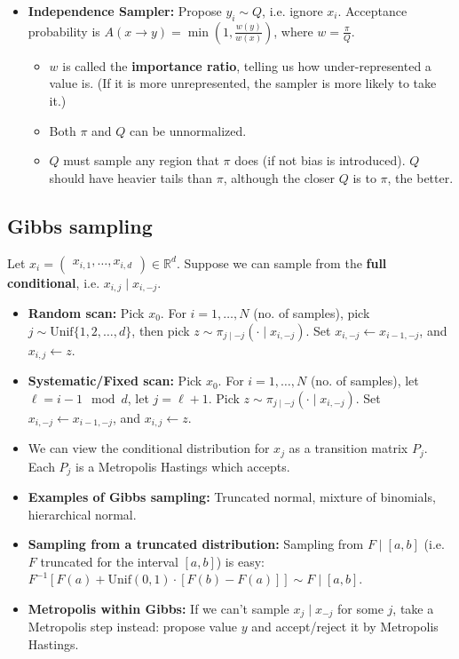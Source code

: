\documentclass[twoside]{article}
\newcommand{\dis}{\displaystyle}
\newcommand\bbR{\mathbb{R}}
\newcommand\goesto{\rightarrow}
\begin{document}
\begin{itemize}
\item \textbf{Independence Sampler:} Propose $y_i \sim Q$, i.e. ignore $x_i$. Acceptance probability is $A(x \goesto y) = \min \left(1, \dis\frac{w(y)}{w(x)} \right)$, where $w = \dis\frac{\pi}{Q}$.
\begin{itemize}
\item $w$ is called the \textbf{importance ratio}, telling us how under-represented a value is. (If it is more unrepresented, the sampler is more likely to take it.)

\item Both $\pi$ and $Q$ can be unnormalized.

\item $Q$ must sample any region that $\pi$ does (if not bias is introduced). $Q$ should have heavier tails than $\pi$, although the closer $Q$ is to $\pi$, the better.

\end{itemize}

\end{itemize}

\subsection*{Gibbs sampling}
Let $x_i = \begin{pmatrix} x_{i,1}, \dots, x_{i, d} \end{pmatrix} \in \bbR^d$. Suppose we can sample from the \textbf{full conditional}, i.e. $x_{i,j} \mid x_{i, -j}$.

\begin{itemize}
\item \textbf{Random scan:} Pick $x_0$. For $i = 1, \dots, N$ (no. of samples), pick $j \sim \text{Unif}\{ 1, 2, \dots, d\}$, then pick $z \sim \pi_{j \mid -j} (\cdot \mid x_{i, -j})$. Set $x_{i, -j} \leftarrow x_{i-1, -j}$, and $x_{i,j} \leftarrow z$.

\item \textbf{Systematic/Fixed scan:} Pick $x_0$. For $i = 1, \dots, N$ (no. of samples), let $\ell = i - 1 \mod d$, let $j = \ell + 1$. Pick $z \sim \pi_{j \mid -j} (\cdot \mid x_{i, -j})$. Set $x_{i, -j} \leftarrow x_{i-1, -j}$, and $x_{i,j} \leftarrow z$.

\item We can view the conditional distribution for $x_j$ as a transition matrix $P_j$. Each $P_j$ is a Metropolis Hastings which accepts.

\item \textbf{Examples of Gibbs sampling:} Truncated normal, mixture of binomials, hierarchical normal.

\item \textbf{Sampling from a truncated distribution:} Sampling from $F \mid [a,b]$ (i.e. $F$ truncated for the interval $[a,b]$) is easy: $F^{-1}[F(a) + \text{Unif}(0,1) \cdot [F(b) - F(a)]] \sim F \mid [a,b]$.

\item \textbf{Metropolis within Gibbs:} If we can't sample $x_j \mid x_{-j}$ for some $j$, take a Metropolis step instead: propose value $y$ and accept/reject it by Metropolis Hastings.

\end{itemize}
\end{document}
